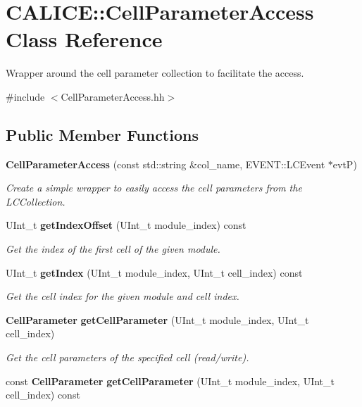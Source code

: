 \section{CALICE::CellParameterAccess Class Reference}
\label{classCALICE_1_1CellParameterAccess}


Wrapper around the cell parameter collection to facilitate the access.  


{\ttfamily \#include $<$CellParameterAccess.hh$>$}\subsection*{Public Member Functions}
\begin{DoxyCompactItemize}
\item 
{\bf CellParameterAccess} (const std::string \&col\_\-name, EVENT::LCEvent $\ast$evtP)
\begin{DoxyCompactList}\small\item\em Create a simple wrapper to easily access the cell parameters from the LCCollection. \item\end{DoxyCompactList}\item 
UInt\_\-t {\bf getIndexOffset} (UInt\_\-t module\_\-index) const 
\begin{DoxyCompactList}\small\item\em Get the index of the first cell of the given module. \item\end{DoxyCompactList}\item 
UInt\_\-t {\bf getIndex} (UInt\_\-t module\_\-index, UInt\_\-t cell\_\-index) const 
\begin{DoxyCompactList}\small\item\em Get the cell index for the given module and cell index. \item\end{DoxyCompactList}\item 
{\bf CellParameter} {\bf getCellParameter} (UInt\_\-t module\_\-index, UInt\_\-t cell\_\-index)
\begin{DoxyCompactList}\small\item\em Get the cell parameters of the specified cell (read/write). \item\end{DoxyCompactList}\item 
const {\bf CellParameter} {\bf getCellParameter} (UInt\_\-t module\_\-index, UInt\_\-t cell\_\-index) const 

\end{DoxyCompactItemize}
